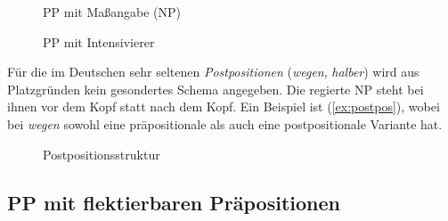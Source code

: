 \begin{figure}
  \centering
  \caption{PP mit Maßangabe (NP)}
  \label{fig:prpgrmitakkmod}
\end{figure}

\begin{figure}
  \centering
  \caption{PP mit Intensivierer}
  \label{fig:prpgrmitadvmod}
\end{figure}


Für die im Deutschen sehr seltenen \textit{Postpositionen} (\zB \textit{wegen}, \textit{halber}) wird aus Platzgründen kein gesondertes Schema angegeben.
Die regierte NP steht bei ihnen vor dem Kopf statt nach dem Kopf.
Ein Beispiel ist (\ref{ex:postpos}), wobei bei \textit{wegen} sowohl eine präpositionale als auch eine postpositionale Variante hat.

\begin{exe}
\end{exe}

\begin{figure}
  \centering
  \caption{Postpositionsstruktur}
  \label{fig:postpos}
\end{figure}

\subsection{PP mit flektierbaren Präpositionen}

\label{sec:syntaxflektierbareprp}


